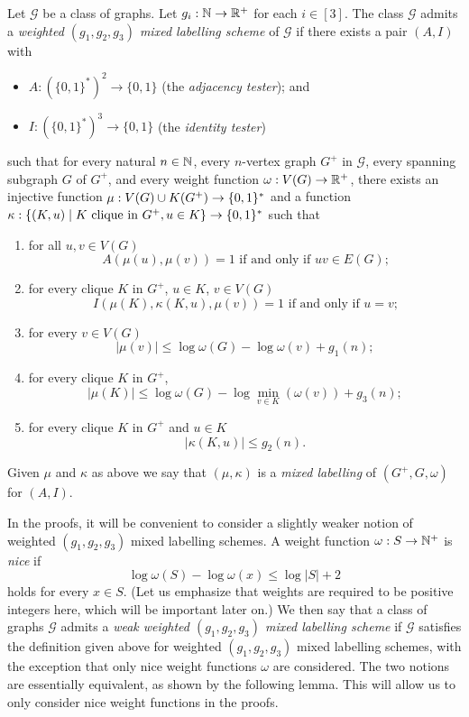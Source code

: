 \documentclass{patmorin}
\renewcommand{\le}{\leqslant}
\renewcommand{\leq}{\leqslant}
\newcommand{\defin}[1]{\emph{\textcolor{brightmaroon}{#1}}}
\DeclarePairedDelimiter{\set}{\{}{\}}
\begin{document}
Let $\mathcal{G}$ be a class of graphs.
Let $g_i:\mathbb{N}\to\mathbb{R}^+$ for each $i\in[3]$.
The class  $\mathcal{G}$ admits a \defin{weighted $(g_1,g_2,g_3)$ mixed labelling scheme} of $\mathcal{G}$ if there exists a pair $(A,I)$ with
\begin{itemize}[nosep,nolistsep]
     \item $A:(\{0,1\}^*)^2\to\{0,1\}$ (the \defin{adjacency tester}); and
     \item $I:(\{0,1\}^*)^3\to\{0,1\}$ (the \defin{identity tester})
\end{itemize}
such that
for every natural $n\in\mathbb{N}$,
every $n$-vertex graph $G^+$ in $\mathcal{G}$,
every spanning subgraph $G$ of $G^+$, and
every weight function $\omega:V(G)\to \mathbb{R}^+$,
there exists an injective function $\mu: V(G)\cup K(G^+) \to \set{0,1}^*$ and a function $\kappa:\{(K, u)\mid \textrm{$K$ clique in $G^+$}, u\in K\}\to \set{0,1}^*$
such that
\begin{enumerate}[nosep,nolistsep,label=(\roman*)]
    \item for all $u,v\in V(G)$
    \[
    \textrm{$A(\mu(u),\mu(v))=1$ if and only if $uv\in E(G)$;}
    \]
    \item for every clique $K$ in $G^+$, $u\in K$, $v\in V(G)$
    \[
    \textrm{$I(\mu(K),\kappa(K, u),\mu(v))=1$ if and only if $u=v$;}
    \]
    \item for every $v\in V(G)$
    \[
    |\mu(v)| \leq \log \omega(G) - \log\omega(v) + g_1(n);
    \]
    \item for every clique $K$ in $G^+$,
    \[
    |\mu(K)|\le \log \omega(G) - \log\min_{v\in K}(\omega(v)) + g_3(n);
    \]
    \item  for every clique $K$ in $G^+$ and $u\in K$
    \[
    |\kappa(K, u)| \leq g_2(n).
    \]
\end{enumerate}
Given $\mu$ and $\kappa$  as above we say that $(\mu,\kappa)$ is a \defin{mixed labelling} of $(G^+,G,\omega)$ for $(A,I)$.

In the proofs, it will be convenient to consider a slightly weaker notion of weighted $(g_1,g_2,g_3)$ mixed labelling schemes.
A weight function $\omega:S\to \mathbb{N}^+$ is \defin{nice} if
\[
  \log \omega(S) - \log \omega(x) \leq \log |S| + 2
\]
holds for every $x\in S$.
(Let us emphasize that weights are required to be positive integers here, which will be important later on.)
We then say that a class of graphs $\mathcal{G}$ admits a \defin{weak weighted $(g_1,g_2,g_3)$ mixed labelling scheme} if $\mathcal{G}$ satisfies the definition given above for weighted $(g_1,g_2,g_3)$ mixed labelling schemes, with the exception that only nice weight functions $\omega$ are considered.
The two notions are essentially equivalent, as shown by the following lemma. This will allow us to only consider nice weight functions in the proofs.
\end{document}
